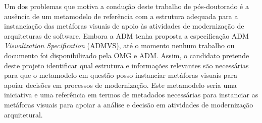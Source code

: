 \documentclass[12pt]{article}
\begin{document}


Um dos problemas que motiva a condução deste trabalho de pós-doutorado é a ausência de um metamodelo de referência com a estrutura adequada para a instanciação das metáforas visuais de apoio às atividades de modernização de arquiteturas de software. Embora a ADM tenha proposta a especificação ADM \textit{Visualization Specification} (ADMVS), até o momento nenhum trabalho ou documento foi disponibilizado pela OMG e ADM. Assim, o candidato pretende deste projeto identificar qual estrutura e informações relevantes são necessárias para que o metamodelo em questão posso instanciar metáforas visuais para apoiar decisões em processos de modernização. Este metamodelo seria uma iniciativa e uma referência em termos de metadados necessárias para instanciar as metáforas visuais para apoiar a análise e decisão em atividades de modernização arquitetural. 
\end{document}
